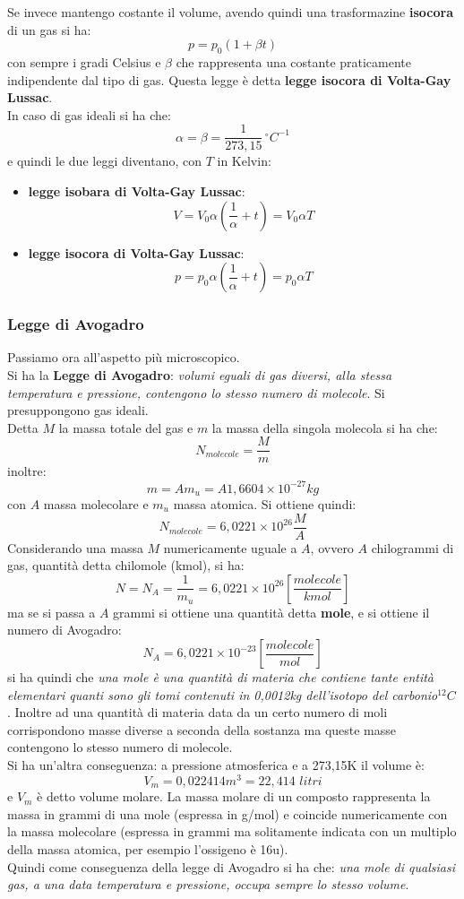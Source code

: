\documentclass[a4paper,12pt, oneside]{book}
\begin{document}
Se invece mantengo costante il volume, avendo quindi una trasformazine \textbf{isocora} di un gas si ha:
$$p=p_0(1+\beta t)$$
con sempre i gradi Celsius e $\beta$ che rappresenta una costante praticamente indipendente dal tipo di gas. Questa legge è detta \textbf{legge isocora di Volta-Gay Lussac}.\\
In caso di gas ideali si ha che:
$$\alpha=\beta=\frac{1}{273,15}\, ^{\circ}C^{-1}$$
e quindi le due leggi diventano, con $T$ in Kelvin:
\begin{itemize}
\item \textbf{legge isobara di Volta-Gay Lussac}:
$$V=V_0\alpha\left(\frac{1}{\alpha}+t\right)=V_0\alpha T$$
\item \textbf{legge isocora di Volta-Gay Lussac}:
$$p=p_0\alpha\left(\frac{1}{\alpha}+t\right)=p_0\alpha T$$
\end{itemize}
\subsubsection{Legge di Avogadro}
Passiamo ora all'aspetto più microscopico.\\
Si ha la \textbf{Legge di Avogadro}: \textit{volumi eguali di gas diversi, alla stessa temperatura e pressione, contengono lo stesso numero di molecole}. Si presuppongono gas ideali.\\
Detta $M$ la massa totale del gas e $m$ la massa della singola molecola si ha che:
$$N_{molecole}=\frac{M}{m}$$
inoltre:
$$m=Am_u=A1,6604\times 10^{-27}kg$$
con $A$ massa molecolare e $m_u$ massa atomica. Si ottiene quindi:
$$N_{molecole}=6,0221\times 10^{26}\frac{M}{A}$$
Considerando una massa $M$ numericamente uguale a $A$, ovvero $A$ chilogrammi di gas, quantità detta chilomole (kmol), si ha:
$$N=N_A=\frac{1}{m_u}=6,0221\times 10^{26}\left[\frac{molecole}{kmol}\right]$$
ma se si passa a $A$ grammi si ottiene una quantità detta \textbf{mole}, e si ottiene il numero di Avogadro:
$$N_A=6,0221\times 10^{-23}\left[\frac{molecole}{mol}\right]$$
si ha quindi che \textit{una mole è una quantità di materia che contiene tante entità elementari quanti sono gli tomi contenuti in 0,0012kg dell'isotopo del carbonio}$^{12}C$. Inoltre ad una quantità di materia data da un certo numero di moli corrispondono masse diverse a seconda della sostanza ma queste masse contengono lo stesso numero di molecole.\\
Si ha un'altra conseguenza: a pressione atmosferica e a 273,15K il volume è:
$$V_m=0,022414m^3=22,414\,\,litri$$
e $V_m$ è detto volume molare. La massa molare di un composto rappresenta la massa in grammi di una mole (espressa in g/mol) e coincide numericamente con la massa molecolare (espressa in grammi ma solitamente indicata con un multiplo della massa atomica, per esempio l'ossigeno è 16u).\\
Quindi come conseguenza della legge di Avogadro si ha che: \textit{una mole di qualsiasi gas, a una data temperatura e pressione, occupa sempre lo stesso volume}.\\
\end{document}
